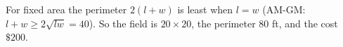For fixed area the perimeter $2(l+w)$ is least when $l=w$ (AM-GM: $l+w\ge2\sqrt{lw}=40$). So the field is $20\times20$, the perimeter $80$ ft, and the cost $\boxed{\$200}$.
